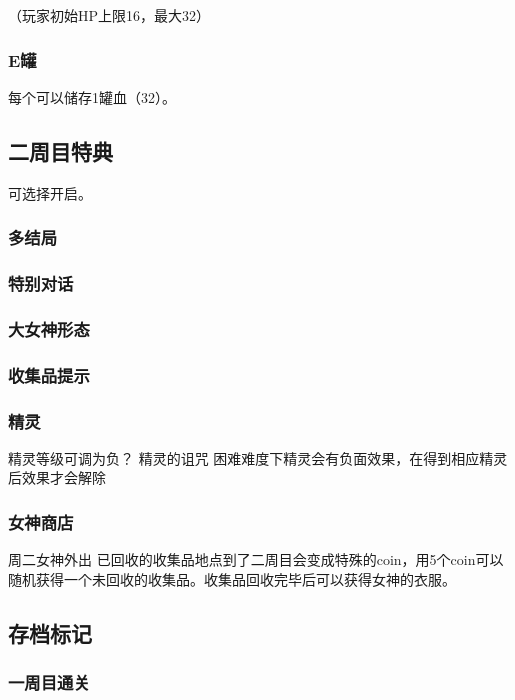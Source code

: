 \documentclass{article}
\begin{document}
（玩家初始HP上限16，最大32）

\subsubsection{E罐}

每个可以储存1罐血（32）。

\subsection{二周目特典}

可选择开启。

\subsubsection{多结局}

\subsubsection{特别对话}

\subsubsection{大女神形态}

\subsubsection{收集品提示}

\subsubsection{精灵}
精灵等级可调为负？
精灵的诅咒
困难难度下精灵会有负面效果，在得到相应精灵后效果才会解除

\subsubsection{女神商店}
周二女神外出
已回收的收集品地点到了二周目会变成特殊的coin，用5个coin可以随机获得一个未回收的收集品。收集品回收完毕后可以获得女神的衣服。

\subsection{存档标记}

\subsubsection{一周目通关}
\end{document}
